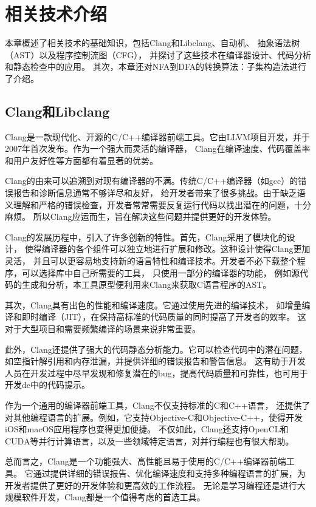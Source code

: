 \chapter{相关技术介绍}
本章概述了相关技术的基础知识，包括Clang和Libclang、自动机、
抽象语法树（AST）以及程序控制流图（CFG），
并探讨了这些技术在编译器设计、代码分析和静态检查中的应用。
其次，本章还对NFA到DFA的转换算法：子集构造法进行了介绍。
\section{Clang和Libclang}
Clang是一款现代化、开源的C/C++编译器前端工具。它由LLVM项目开发，并于2007年首次发布。作为一个强大而灵活的编译器，
Clang在编译速度、代码覆盖率和用户友好性等方面都有着显著的优势。

Clang的由来可以追溯到对现有编译器的不满。传统C/C++编译器（如gcc）的错误报告和诊断信息通常不够详尽和友好，
给开发者带来了很多挑战。由于缺乏语义理解和严格的错误检查，开发者常常需要反复运行代码以找出潜在的问题，十分麻烦。
所以Clang应运而生，旨在解决这些问题并提供更好的开发体验。

Clang的发展历程中，引入了许多创新的特性。首先，Clang采用了模块化的设计，
使得编译器的各个组件可以独立地进行扩展和修改。这种设计使得Clang更加灵活，
并且可以更容易地支持新的语言特性和编译技术。开发者不必下载整个程序，可以选择库中自己所需要的工具，
只使用一部分的编译器的功能，
例如源代码的生成和分析，本工具原型便利用来Clang来获取C语言程序的AST。

其次，Clang具有出色的性能和编译速度。它通过使用先进的编译技术，
如增量编译和即时编译（JIT），在保持高标准的代码质量的同时提高了开发者的效率。
这对于大型项目和需要频繁编译的场景来说非常重要。

此外，Clang还提供了强大的代码静态分析能力。它可以检查代码中的潜在问题，
如空指针解引用和内存泄漏，并提供详细的错误报告和警告信息。
这有助于开发人员在开发过程中尽早发现和修复潜在的bug，提高代码质量和可靠性，也可用于开发de中的代码提示。

作为一个通用的编译器前端工具，Clang不仅支持标准的C和C++语言，
还提供了对其他编程语言的扩展。例如，它支持Objective-C和Objective-C++，使得开发iOS和macOS应用程序也变得更加便捷。
不仅如此，Clang还支持OpenCL和CUDA等并行计算语言，以及一些领域特定语言，对并行编程也有很大帮助。

总而言之，Clang是一个功能强大、高性能且易于使用的C/C++编译器前端工具。
它通过提供详细的错误报告、优化编译速度和支持多种编程语言的扩展，为开发者提供了更好的开发体验和更高效的工作流程。
无论是学习编程还是进行大规模软件开发，Clang都是一个值得考虑的首选工具。\\


